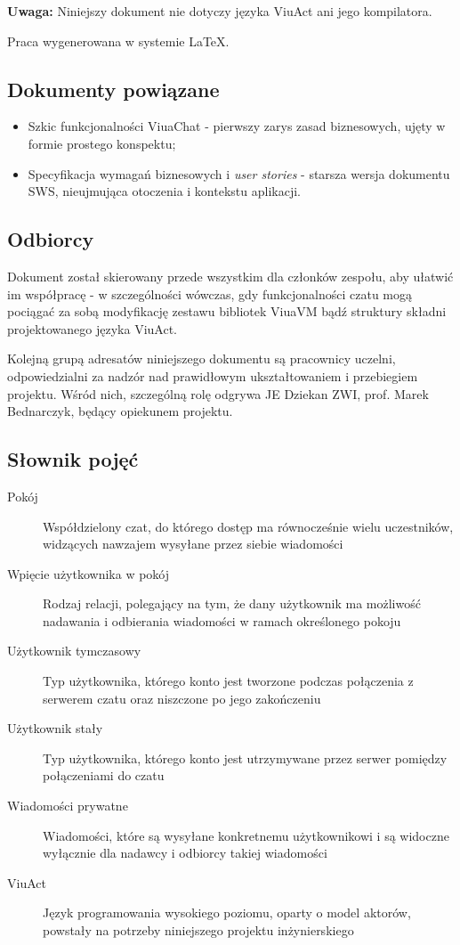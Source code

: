 \documentclass[11pt,oneside,a4paper,titlepage,onecolumn]{article}
\begin{document}
\textbf{Uwaga:} Niniejszy dokument nie dotyczy języka ViuAct ani jego kompilatora.

Praca wygenerowana w systemie \LaTeX.

\subsection{Dokumenty powiązane}
\begin{itemize}
	\item Szkic funkcjonalności ViuaChat - pierwszy zarys zasad biznesowych, ujęty w formie prostego konspektu;
	\item Specyfikacja wymagań biznesowych i \textit{user stories} - starsza wersja dokumentu SWS, nieujmująca otoczenia i kontekstu aplikacji.
\end{itemize}

\subsection{Odbiorcy}
Dokument został skierowany przede wszystkim dla członków zespołu, aby ułatwić im współpracę - w szczególności wówczas, gdy funkcjonalności czatu mogą pociągać za sobą modyfikację zestawu bibliotek ViuaVM bądź struktury składni projektowanego języka ViuAct.

Kolejną grupą adresatów niniejszego dokumentu są pracownicy uczelni, odpowiedzialni za nadzór nad prawidłowym ukształtowaniem i przebiegiem projektu. Wśród nich, szczególną rolę odgrywa JE Dziekan ZWI, prof. Marek Bednarczyk, będący opiekunem projektu.

\subsection{Słownik pojęć}
\begin{description}
  \item[Pokój] Współdzielony czat, do którego dostęp ma równocześnie wielu uczestników, widzących nawzajem wysyłane przez siebie wiadomości
  \item[Wpięcie użytkownika w pokój] Rodzaj relacji, polegający na tym, że dany użytkownik ma możliwość nadawania i odbierania wiadomości w ramach określonego pokoju
  \item[Użytkownik tymczasowy] Typ użytkownika, którego konto jest tworzone podczas połączenia z serwerem czatu oraz niszczone po jego zakończeniu
  \item[Użytkownik stały] Typ użytkownika, którego konto jest utrzymywane przez serwer pomiędzy połączeniami do czatu
  \item[Wiadomości prywatne] Wiadomości, które są wysyłane konkretnemu użytkownikowi i są widoczne wyłącznie dla nadawcy i odbiorcy takiej wiadomości
  \item[ViuAct] Język programowania wysokiego poziomu, oparty o model aktorów, powstały na potrzeby niniejszego projektu inżynierskiego
\end{description}
\end{document}
